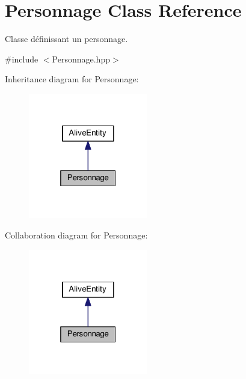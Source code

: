 \hypertarget{class_personnage}{\section{Personnage Class Reference}
\label{class_personnage}
}


Classe définissant un personnage.  




{\ttfamily \#include $<$Personnage.\+hpp$>$}



Inheritance diagram for Personnage\+:
\nopagebreak
\begin{figure}[H]
\begin{center}
\leavevmode
\includegraphics[width=148pt]{class_personnage__inherit__graph}
\end{center}
\end{figure}


Collaboration diagram for Personnage\+:
\nopagebreak
\begin{figure}[H]
\begin{center}
\leavevmode
\includegraphics[width=148pt]{class_personnage__coll__graph}
\end{center}
\end{figure}
